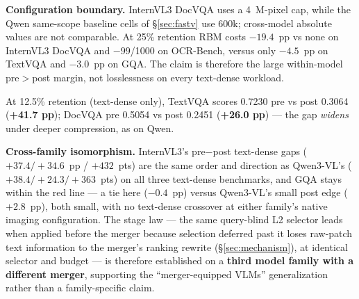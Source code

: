 \documentclass[sigconf,review,anonymous]{acmart}
\begin{document}
\textbf{Configuration boundary.} InternVL3 DocVQA uses a 4~M-pixel cap, while
the Qwen same-scope baseline cells of \S\ref{sec:fastv} use 600k; cross-model
absolute values are not comparable. At 25\% retention RBM costs $-19.4$~pp vs
none on InternVL3 DocVQA and $-99$/1000 on OCR-Bench, versus only $-4.5$~pp on
TextVQA and $-3.0$~pp on GQA. The claim is therefore the large within-model
pre$>$post margin, not losslessness on every text-dense workload.

At 12.5\% retention (text-dense only), TextVQA scores 0.7230 pre
vs post 0.3064 (\textbf{+41.7 pp}); DocVQA pre 0.5054 vs post 0.2451
(\textbf{+26.0 pp}) --- the gap \emph{widens} under deeper compression, as on
Qwen.

\textbf{Cross-family isomorphism.} InternVL3's pre$-$post text-dense gaps
($+37.4 / +34.6$~pp / $+432$~pts) are the same order and direction as
Qwen3-VL's ($+38.4 / +24.3 / +363$~pts) on all three text-dense benchmarks, and
GQA stays within the red line --- a tie here ($-0.4$~pp) versus Qwen3-VL's small
post edge ($+2.8$~pp), both small, with no text-dense crossover at either
family's native imaging configuration. The stage law --- the same query-blind L2
selector leads when applied before the merger because selection deferred past it
loses raw-patch text information to the merger's ranking rewrite
(\S\ref{sec:mechanism}), at identical selector and budget --- is therefore
established on a \textbf{third model family with a different merger}, supporting
the ``merger-equipped VLMs'' generalization rather than a family-specific claim.
\end{document}
